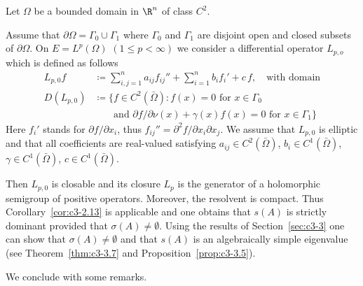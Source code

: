 \begin{example}\label{ex:c3-2.14}
	Let $\Omega$ be a bounded domain in $\R ^{n}$ of class $C^{2}$.
	
	Assume that $\partial\Omega = \Gamma_{0}\cup\Gamma_{1}$ where $\Gamma_{0}$ and $\Gamma_{1}$ are disjoint open and closed subsets of\/ $\partial\Omega$.
    On $E = L^{p}(\Omega)$ $(1 \leq p < \infty)$ we consider a differential operator $L_{p,o}$ which is defined as follows
\begin{equation}\label{eq:c3-2.23}
    \begin{split}
        L_{p,0}f &\coloneqq \sum_{i,j=1}^{n} a_{ij} f_{ij}'' 
                  + \sum_{i=1}^{n} b_{i} f_{i}' + c\,f, 
                  \quad \text{with domain} \\
        D(L_{p,0}) &\coloneqq \{f \in C^{2}(\bar{\Omega}) \colon 
                    f(x) = 0 \text{ for } x \in \Gamma_{0} \\
                   &\phantom{\coloneqq\{} \text{and } 
                    \partial f/\partial\nu(x) + \gamma(x)f(x) = 0 
                    \text{ for } x \in \Gamma_{1}\}
    \end{split}
\end{equation}
Here $f_{i}'$ stands for $\partial f/\partial x_{i}$, thus $f_{ij}'' = \partial^{2}f/\partial x_{i}\partial x_{j}$.
We assume that $L_{p,0}$ is elliptic and that all coefficients are real-valued satisfying $a_{ij} \in C^{2}(\bar{\Omega})$, $b_{i} \in C^{1}(\bar{\Omega})$, $\gamma \in C^{1}(\bar{\Omega})$, $c \in C^{1}(\bar{\Omega})$.

Then $L_{p,0}$ is closable and its closure $L_{p}$ is the generator of a holomorphic semigroup of positive operators.
Moreover, the resolvent is compact.
Thus Corollary~\ref{cor:c3-2.13} is applicable and one obtains that $s(A)$ is strictly dominant provided that $\sigma(A) \neq \emptyset$.
Using the results of Section~\ref{sec:c3-3} one can show that $\sigma(A) \neq \emptyset$ and that $s(A)$ is an algebraically simple eigenvalue (see Theorem~\ref{thm:c3-3.7} and Proposition~\ref{prop:c3-3.5}).
\end{example}
We conclude with some remarks.
